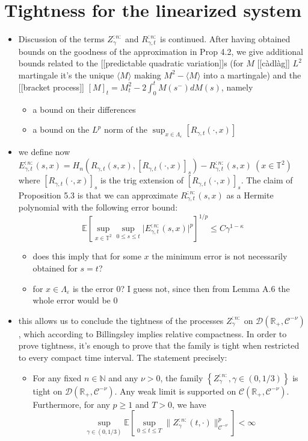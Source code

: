 \documentclass{report}
\theoremstyle{remark}
\theoremstyle{definition}
\let\epsilon\varepsilon
\begin{document}
\chapter{Tightness for the linearized system}
\begin{itemize}
  \item Discussion of the terms $Z_\gamma^{:n:}$ and $R_{\gamma, t}^{:n:}$ is continued. After having obtained bounds on the goodness of the approximation in Prop 4.2, we give additional bounds related to the [[predictable quadratic variation]]s (for $M$ [[càdlàg]] $L^2$ martingale it's the unique $\langle M \rangle$ making $M^2 -  \langle M \rangle$ into a martingale) and the [[bracket process]] $[M]_t = M^2_t - 2\int_0^t M(s^-)dM(s)$, namely
  \begin{itemize}
    \item a bound on their differences
    \item a bound on the $L^p$ norm of the $\sup_{x \in \Lambda_\epsilon} [R_{\gamma, t}(\cdot, x)]$ 
  \end{itemize}
  \item we define now $E^{:n:}_{\gamma, t}(s, x) = H_n(R_{\gamma, t}(s, x), [R_{\gamma, t}(\cdot, x)]_s) - R^{:n:}_{\gamma, t}(s, x)~(x\in \mathbb{T}^2)$ where $[R_{\gamma, t}(\cdot, x)]_s$ is the trig extension of $[R_{\gamma, t}(\cdot, x)]_s$. The claim of Proposition 5.3 is that we can approximate $R^{:n:}_{\gamma, t}(s, x)$ as a Hermite polynomial with the following error bound:$$\mathbb{E}[\sup_{x\in\mathbb{T}^2}\sup_{0\le s \le t} \lvert E^{:n:}_{\gamma, t}(s, x)\rvert^p]^{1/p} \le C \gamma^{1 - \kappa}$$
  \begin{itemize}
    \item does this imply that for some $x$ the minimum error is not necessarily obtained for $s = t$?
    \item for $x\in \Lambda_{\epsilon}$ is the error $0$? I guess not, since then from Lemma A.6 the whole error would be 0
  \end{itemize}
  \item this allows us to conclude the tightness of the processes $Z^{:n:}_\gamma$ on $\mathcal{D}(\mathbb{R}_+, \mathcal{C}^{-\nu})$, which according to Billingsley implies relative compactness. In order to prove tightness, it's enough to prove that the family is tight when restricted to every compact time interval. The statement precisely:
  \begin{itemize}
    \item For any fixed $n\in \mathbb{N}$ and any $\nu > 0$, the family $\left\{Z^{:n:}_{\gamma}, \gamma \in (0, 1/3) \right\}$ is tight on $\mathcal{D}(\mathbb{R}_+, \mathcal{C}^{-\nu})$. Any weak limit is supported on $\mathcal{C}(\mathbb{R}_+, \mathcal{C}^{-\nu})$. Furthermore, for any $p \ge 1$ and $T > 0$, we have $$\sup_{\gamma \in (0, 1/3)} \mathbb{E}\left[ \sup_{0 \le t \le T} \lVert Z^{:n:}_\gamma(t, \cdot)\rVert^p_{\mathcal{C}^{-\nu}} \right] < \infty$$

\end{itemize}
\end{itemize}
\end{document}
